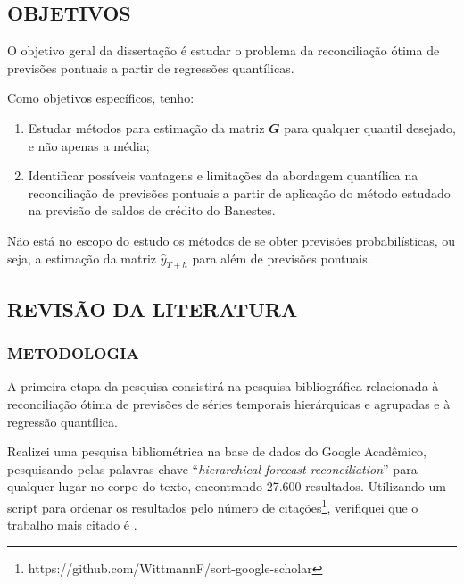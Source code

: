 \documentclass[
  12pt,
  oneside,
  a4paper,
  chapter=TITLE,
  section=TITLE,
  subsubsection=TITLE,
  brazil]{abntex2}
\providecommand{\tightlist}{%
  \setlength{\itemsep}{0pt}\setlength{\parskip}{0pt}}\usepackage{longtable,booktabs,array}
\begin{document}
\hypertarget{objetivos}{%
\subsection{OBJETIVOS}\label{objetivos}}

O objetivo geral da dissertação é estudar o problema da reconciliação
ótima de previsões pontuais a partir de regressões quantílicas.

Como objetivos específicos, tenho:

\begin{enumerate}
\def\labelenumi{\arabic{enumi}.}
\tightlist
\item
  Estudar métodos para estimação da matriz \(\mathbfit{G}\) para
  qualquer quantil desejado, e não apenas a média;
\item
  Identificar possíveis vantagens e limitações da abordagem quantílica
  na reconciliação de previsões pontuais a partir de aplicação do método
  estudado na previsão de saldos de crédito do Banestes.
\end{enumerate}

Não está no escopo do estudo os métodos de se obter previsões
probabilísticas, ou seja, a estimação da matriz \(\hat{y}_{T+h}\) para
além de previsões pontuais.

\hypertarget{revisuxe3o-da-literatura}{%
\subsection{REVISÃO DA LITERATURA}\label{revisuxe3o-da-literatura}}

\hypertarget{metodologia}{%
\subsubsection{METODOLOGIA}\label{metodologia}}

A primeira etapa da pesquisa consistirá na pesquisa bibliográfica
relacionada à reconciliação ótima de previsões de séries temporais
hierárquicas e agrupadas e à regressão quantílica.

Realizei uma pesquisa bibliométrica na base de dados do Google
Acadêmico, pesquisando pelas palavras-chave ``\emph{hierarchical
forecast reconciliation}'' para qualquer lugar no corpo do texto,
encontrando 27.600 resultados. Utilizando um script para ordenar os
resultados pelo número de citações\footnote{https://github.com/WittmannF/sort-google-scholar},
verifiquei que o trabalho mais citado é \textcite{hyndman2021}.
\end{document}
